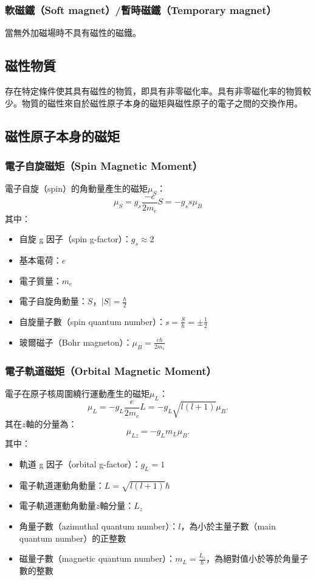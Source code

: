 \documentclass[a4paper,12pt]{report}
\begin{document}
\begin{itemize}
\subsubsection{軟磁鐵（Soft magnet）/暫時磁鐵（Temporary magnet）}
當無外加磁場時不具有磁性的磁鐵。
\subsection{磁性物質}
存在特定條件使其具有磁性的物質，即具有非零磁化率。具有非零磁化率的物質較少。物質的磁性來自於磁性原子本身的磁矩與磁性原子的電子之間的交換作用。
\subsection{磁性原子本身的磁矩}
\subsubsection{電子自旋磁矩（Spin Magnetic Moment）}
電子自旋（spin）的角動量產生的磁矩$\mu_S$：
\[\mu_S=g_s\frac{-e}{2m_e}S=-g_ss\mu_B\]
其中：
\begin{itemize}
\item 自旋 g 因子（spin g-factor）：$g_s\approx 2$
\item 基本電荷：$e$
\item 電子質量：$m_e$
\item 電子自旋角動量：$S$，$|S|=\frac{\hbar}{2}$
\item 自旋量子數（spin quantum number）：$s=\frac{S}{\hbar}=\pm\frac{1}{2}$
\item 玻爾磁子（Bohr magneton）：$\mu_B=\frac{e\hbar}{2m_e}$
\end{itemize}
\subsubsection{電子軌道磁矩（Orbital Magnetic Moment）}
電子在原子核周圍繞行運動產生的磁矩$\mu_L$：
\[\mu_L=-g_L\frac{e}{2m_e}L=-g_L\sqrt{l(l+1)}\mu_B.\]
其在$z$軸的分量為：
\[\mu_{Lz}=-g_Lm_L\mu_B.\]
其中：
\begin{itemize}
\item 軌道 g 因子（orbital g-factor）：$g_L=1$
\item 電子軌道運動角動量：$L=\sqrt{l(l+1)}\hbar$
\item 電子軌道運動角動量$z$軸分量：$L_z$
\item 角量子數（azimuthal quantum number）：$l$，為小於主量子數（main quantum number）的正整數
\item 磁量子數（magnetic quantum number）：$m_L=\frac{L_z}{\hbar}$，為絕對值小於等於角量子數的整數
\end{itemize}

\end{itemize}
\end{document}
